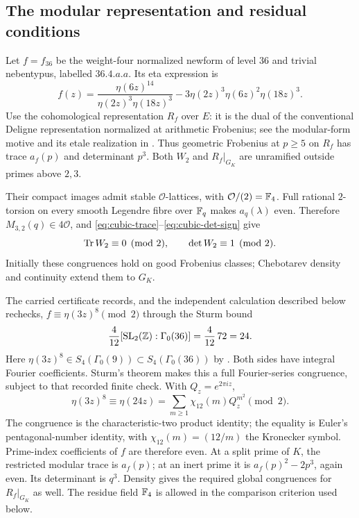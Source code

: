 \subsection{The modular representation and residual conditions}
Let $f=f_{36}$ be the weight-four normalized newform of level $36$
and trivial nebentypus, labelled $36.4.a.a$. Its eta expression is
\cite[Table 1]{LTYZ}
\begin{equation}\label{eq:f36-eta}
 f(z)=\frac{\eta(6z)^{14}}{\eta(2z)^3\eta(18z)^3}
       -3\eta(2z)^3\eta(6z)^2\eta(18z)^3.
\end{equation}
Use the cohomological representation $R_f$ over $E$: it is the dual of
the conventional Deligne representation normalized at arithmetic
Frobenius; see the modular-form motive and its etale realization in
\cite[Theorem~1.2.4(i)]{SchollMotives}.
Thus geometric Frobenius at $p\ge5$ on $R_f$ has trace
$a_f(p)$ and determinant $p^3$. Both $W_2$ and $R_f|_{G_K}$ are
unramified outside primes above $2,3$.

Their compact images admit stable $\mathcal O$-lattices, with
$\mathcal O/(2)=\mathbb F_4$. Full rational $2$-torsion on every smooth
Legendre fibre over $\mathbb F_q$ makes $a_q(\lambda)$ even. Therefore
$M_{3,2}(q)\in4\mathcal O$, and
\eqref{eq:cubic-trace}--\eqref{eq:cubic-det-sign} give
\[
 \operatorname{Tr} W_2\equiv0\pmod2,\qquad \det W_2\equiv1\pmod2.
\]
Initially these congruences hold on good Frobenius classes;
Chebotarev density and continuity extend them to $G_K$.

The carried certificate records, and the independent calculation described
below rechecks,
$f\equiv\eta(3z)^8\pmod2$ through the Sturm bound
\[
 \frac4{12}[\operatorname{SL}_2(\mathbb Z):\Gamma_0(36)]
 =\frac4{12}\,72=24.
\]
Here $\eta(3z)^8\in S_4(\Gamma_0(9))\subset S_4(\Gamma_0(36))$
by \cite[Table~1]{LTYZ}. Both sides have integral Fourier coefficients.
Sturm's theorem \cite[Theorem~1, p.~276]{Sturm} makes this a full
Fourier-series congruence,
subject to that recorded finite check. With $Q_z=e^{2\pi iz}$,
\[
 \eta(3z)^8\equiv\eta(24z)
 =\sum_{m\ge1}\chi_{12}(m)Q_z^{m^2}\pmod2.
\]
The congruence is the characteristic-two product identity; the equality
is Euler's pentagonal-number identity, with
$\chi_{12}(m)=(12/m)$ the Kronecker symbol. Prime-index coefficients of $f$ are therefore
even. At a split prime of $K$, the restricted modular trace is $a_f(p)$;
at an inert prime it is $a_f(p)^2-2p^3$, again even. Its determinant
is $q^3$. Density gives the required global congruences for
$R_f|_{G_K}$ as well. The residue field $\mathbb F_4$ is allowed in the
comparison criterion used below.

